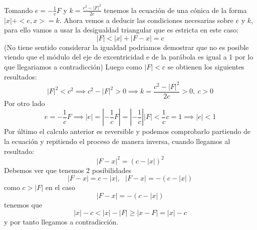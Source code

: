 \documentclass[a4paper, 11pt]{article} %
\begin{document}
	Tomando $e = -\frac{1}{c}F $ y $k = \frac{c^2-|F|^2}{2c}$ tenemos la ecuación de una cónica de la forma $|x|+<e,x>=k$.
	Ahora vemos a deducir las condiciones necesarias sobre $e$ y $k$,
	para ello vamos a usar la desigualdad triangular que es estricta en este caso: \\
	$$|F| < |x| + |F-x| = c $$
	(No tiene sentido considerar la igualdad podriamos demostrar que no es posible viendo que el módulo del eje de excentricidad e de la parábola es igual a 1 por lo que llegariamos a contradicción)
	Luego como $|F| < c$ se obtienen los siguientes resultados:
	$$|F|^2 < c^2 \implies c^2-|F|^2>0 \implies k = \frac{c^2-|F|^2}{2c} > 0, \ c>0$$ 
	Por otro lado 
	$$e = -\frac{1}{c}F \implies |e| = |-\frac{1}{c}F| = |-\frac{1}{c}||F| < \frac{1}{c}c = 1 \implies |e|<1$$
	Por último el calculo anterior es reversible y podemos comprobarlo partiendo de la ecuación y repitiendo el proceso de manera inversa, cuando llegamos al resultado:
		$$ |F-x|^2 = (c-|x|)^2 $$ Debemos ver que tenemos 2 posibilidades
		$$|F-x| = c-|x|,\ \ \ |F-x| =- (c-|x|)$$ 		
		 como $c > |F|$ en el caso $$ |F-x| =- (c-|x|)$$ tenemos que 
		 $$|x|-c<|x|-|F| \geq |x-F| = |x|-c$$y por tanto llegamos a contradicción.
\end{document}
